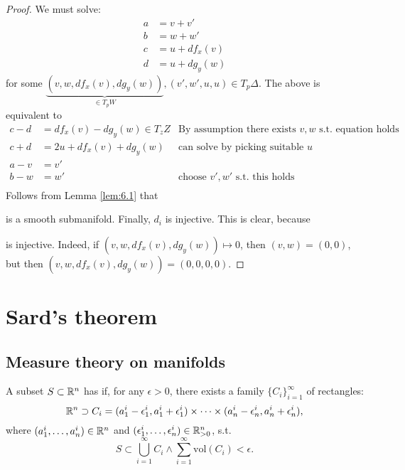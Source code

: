 \begin{proof}

    We must solve: 
    \begin{align*}
        a&=v+v'\\
        b&=w+w'\\
        c&=u+df_x(v)\\
        d&=u+dg_y(w)
    \end{align*}
    for some \(\underbrace{(v,w,df_x(v),dg_y(w))}_{\in T_pW}, (v',w',u,u)\in T_p\Delta\).
    The above is equivalent to 
    \begin{align*}
        c-d  & = df_x(v)-dg_y(w)\in T_zZ & \text{By assumption there exists \(v,w\) s.t. equation holds}\\
        c+d &=2u+df_x(v)+dg_y(w) & \text{can solve by picking suitable } u \\
        a-v&=v'&\\
        b-w&=w' & \text{choose } v',w'\text{ s.t. this holds}\\ 
    \end{align*}   %
    Follows from Lemma \ref{lem:6.1} that
    \begin{center}
    \end{center}
    is a smooth submanifold. Finally, \(d_i\) is injective. This is clear, because  is injective. Indeed, if \((v,w,df_x(v),dg_y(w))\mapsto 0\), then \((v,w)=(0,0)\), but then 
    \((v,w,df_x(v),dg_y(w))=(0,0,0,0)\).
\end{proof}

\section{Sard's theorem}

\subsection{Measure theory on manifolds}

\begin{definition*}
    A subset $S\subset \mathbb{R}^n$ has  if, for any \(\epsilon>0\), there exists a family 
    \(\{C_i\}_{i=1}^\infty\) of rectangles:
    \[\mathbb{R}^n\supset C_i = (a_1^i-\epsilon_1^i,a_1^i+\epsilon_1^i)\times\dots\times (a_n^i-\epsilon_n^i,a_n^i+\epsilon_n^i),\]
    where \((a_1^i,\dots,a_n^i)\in\mathbb{R}^n\) and \((\epsilon_1^i,\dots,\epsilon_n^i)\in\mathbb{R}_{>0}^n\), s.t. 
    \[S\subset \bigcup_{i=1}^\infty C_i\land \sum_{i=1}^\infty \text{vol}(C_i)<\epsilon.\] 
\end{definition*}

